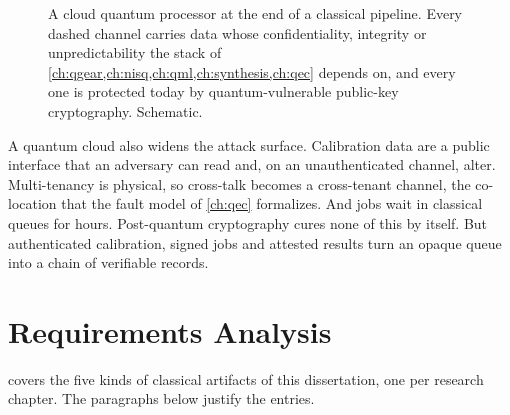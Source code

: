 \begin{figure}[htbp]
\caption{A cloud quantum processor at the end of a classical pipeline. Every dashed channel carries data whose confidentiality, integrity or unpredictability the stack of \cref{ch:qgear,ch:nisq,ch:qml,ch:synthesis,ch:qec} depends on, and every one is protected today by quantum-vulnerable public-key cryptography. Schematic.}
\label{fig:pqc:stack}
\end{figure}

A quantum cloud also widens the attack surface. Calibration data are a public interface that an adversary can read and, on an unauthenticated channel, alter. Multi-tenancy is physical, so cross-talk becomes a cross-tenant channel, the co-location that the fault model of \cref{ch:qec} formalizes. And jobs wait in classical queues for hours. Post-quantum cryptography cures none of this by itself. But authenticated calibration, signed jobs and attested results turn an opaque queue into a chain of verifiable records.

\section{Requirements Analysis}\label{sec:pqc:requirements}

 covers the five kinds of classical artifacts of this dissertation, one per research chapter. The paragraphs below justify the entries.

